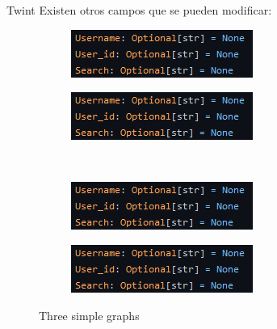 \documentclass{beamer}
\begin{document}
	\begin{frame}{Twint}
		Existen otros campos que se pueden modificar:
		\begin{figure}
			\centering
			\begin{subfigure}[b]{0.4\textwidth}
				\centering
				\includegraphics[width=\textwidth]{../imgs/twint_user.png}
			\end{subfigure}
			\hfill
			\begin{subfigure}[b]{0.4\textwidth}
				\centering
				\includegraphics[width=\textwidth]{../imgs/twint_user.png}
			\end{subfigure}\\
		
			\begin{subfigure}[b]{0.4\textwidth}
				\centering
				\includegraphics[width=\textwidth]{../imgs/twint_user.png}
			\end{subfigure}
			\hfill
			\begin{subfigure}[b]{0.4\textwidth}
				\centering
				\includegraphics[width=\textwidth]{../imgs/twint_user.png}

			\end{subfigure}
			\caption{Three simple graphs}
		\end{figure}
	\end{frame}
\end{document}
